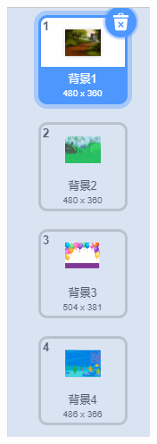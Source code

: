 \documentclass[10pt, a4paper]{article}
\begin{document}
\begin{enumerate}
\begin{figure}[htbp]
\begin{minipage}[t]{.1\textwidth}
            \end{minipage}
            \begin{minipage}[t]{.09\textwidth}
                \centering
                \includegraphics[width=\textwidth]{3.png}

\end{minipage}
\end{figure}
\end{enumerate}
\end{document}
